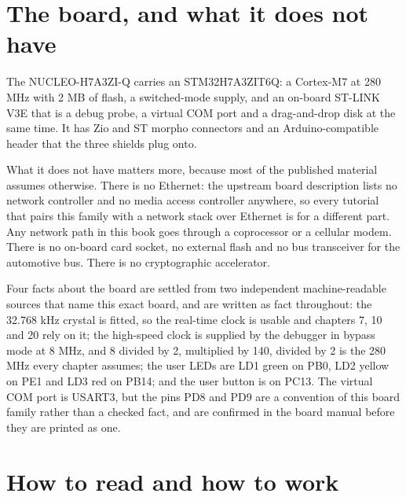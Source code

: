 \section*{The board, and what it does not have}

The NUCLEO-H7A3ZI-Q carries an STM32H7A3ZIT6Q: a Cortex-M7 at 280 MHz with 2 MB of flash, a switched-mode supply, and an on-board ST-LINK V3E that is a debug probe, a virtual COM port and a drag-and-drop disk at the same time. It has Zio and ST morpho connectors and an Arduino-compatible header that the three shields plug onto.

What it does not have matters more, because most of the published material assumes otherwise. There is no Ethernet: the upstream board description lists no network controller and no media access controller anywhere, so every tutorial that pairs this family with a network stack over Ethernet is for a different part. Any network path in this book goes through a coprocessor or a cellular modem. There is no on-board card socket, no external flash and no bus transceiver for the automotive bus. There is no cryptographic accelerator.

Four facts about the board are settled from two independent machine-readable sources that name this exact board, and are written as fact throughout: the 32.768 kHz crystal is fitted, so the real-time clock is usable and chapters 7, 10 and 20 rely on it; the high-speed clock is supplied by the debugger in bypass mode at 8 MHz, and 8 divided by 2, multiplied by 140, divided by 2 is the 280 MHz every chapter assumes; the user LEDs are LD1 green on PB0, LD2 yellow on PE1 and LD3 red on PB14; and the user button is on PC13. The virtual COM port is USART3, but the pins PD8 and PD9 are a convention of this board family rather than a checked fact, and are confirmed in the board manual before they are printed as one.

\section*{How to read and how to work}

